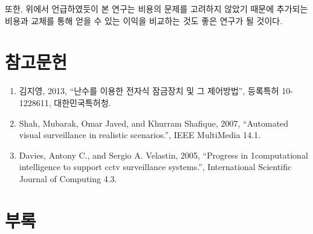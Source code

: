\documentclass[11pt,a4paper]{article}
\begin{document}
또한, 위에서 언급하였듯이 본 연구는 비용의 문제를 고려하지 않았기 때문에
추가되는 비용과 교체를 통해 얻을 수 있는 이익을 비교하는 것도 좋은 연구가 될
것이다.

\section{참고문헌}
\begin{enumerate}
\item 김지영, 2013, ``난수를 이용한 전자식 잠금장치 및 그 제어방법'', 등록특허 10-1228611, 대한민국특허청.
\item Shah, Mubarak, Omar Javed, and Khurram Shafique, 2007, ``Automated visual surveillance in realistic scenarios.'', IEEE MultiMedia 14.1.
\item Davies, Antony C., and Sergio A. Velastin, 2005, ``Progress in 1computational intelligence to support cctv surveillance systems.'', International Scientific Journal of Computing 4.3.
\end{enumerate}

\pagebreak
\section{부록}
\end{document}
